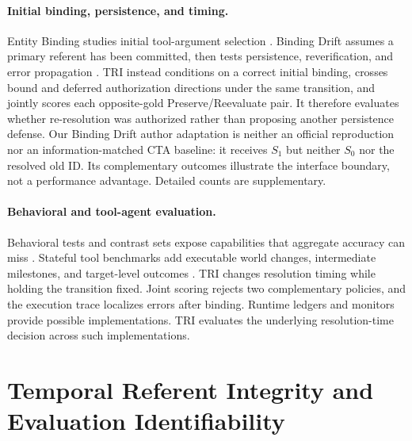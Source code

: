 \documentclass[letterpaper]{article}
\begin{document}
\paragraph{Initial binding, persistence, and timing.}
Entity Binding studies initial tool-argument selection \cite{babu2026entitybinding}. Binding Drift
assumes a primary referent has been committed, then tests persistence, reverification, and error
propagation \cite{babu2026bindingdrift}. TRI instead conditions on a correct initial binding,
crosses bound and deferred authorization directions under the same transition, and jointly scores
each opposite-gold Preserve/Reevaluate pair. It therefore evaluates whether re-resolution was
authorized rather than proposing another persistence defense. Our Binding Drift author adaptation
is neither an official reproduction nor an information-matched CTA baseline: it receives $S_1$
but neither $S_0$ nor the resolved old ID. Its complementary outcomes illustrate the interface
boundary, not a performance advantage. Detailed counts are supplementary.

\paragraph{Behavioral and tool-agent evaluation.}
Behavioral tests and contrast sets expose capabilities that aggregate accuracy can miss
\cite{ribeiro2020checklist,gardner2020contrast}. Stateful tool benchmarks add executable world
changes, intermediate milestones, and target-level outcomes
\cite{li2023apibank,liu2024agentbench,lu2025toolsandbox,trivedi2024appworld,
yao2024taubench,sierra2026tau3,yang2026probench}. TRI changes resolution timing while holding the
transition fixed. Joint scoring rejects two complementary policies, and the execution trace
localizes errors after binding. Runtime ledgers and monitors \cite{uddin2026ledgeragent,sohail2026bounded,
wang2025agentspec,li2026vigil} provide possible implementations. TRI evaluates the underlying
resolution-time decision across such implementations.

\section{Temporal Referent Integrity and Evaluation Identifiability}
\end{document}
